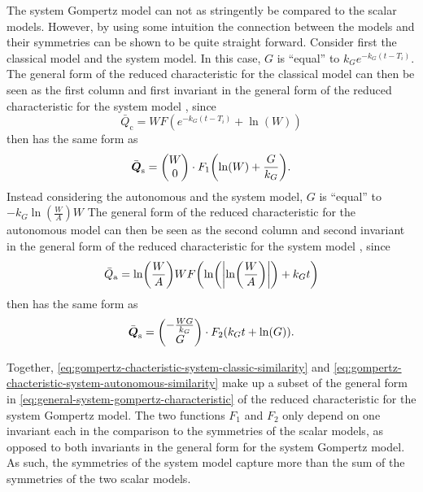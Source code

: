 The system Gompertz model can not as stringently be compared to the scalar models.
However, by using some intuition the connection between the models and their symmetries can be shown to be quite straight forward.
Consider first the classical model and the system model.
In this case, \(G\) is \enquote{equal} to \(k_G e^{-k_G (t - T_i)}\).
The general form of the reduced characteristic for the classical model  can then be seen as the first column and first invariant in the general form of the reduced characteristic for the system model , since
\begin{equation*}
  \bar{Q}_{\text{c}} = W F\left(e^{-k_G (t - T_i)} + \ln\left(W\right)\right)
\end{equation*}
then has the same form as
\begin{equation} \label{eq:gompertz-chacteristic-system-classic-similarity}
  \bar{\vect{Q}}_{\text{s}} =
  \begin{pmatrix}
    W \\
    0
  \end{pmatrix}
  \cdot F_1\left(\ln\left(W\right) + \frac{G}{k_G}\right).
\end{equation}
Instead considering the autonomous and the system model, \(G\) is \enquote{equal} to \(-k_G \ln\left(\frac{W}{A}\right) W\)
The general form of the reduced characteristic for the autonomous model  can then be seen as the second column and second invariant in the general form of the reduced characteristic for the system model , since
\begin{equation*}
  \bar{Q}_{\text{a}} = \ln\left(\frac{W}{A}\right) W F\left(\ln\left(\abs{\ln\left(\frac{W}{A}\right)}\right) + k_G t\right)
\end{equation*}
then has the same form as
\begin{equation} \label{eq:gompertz-chacteristic-system-autonomous-similarity}
  \bar{\vect{Q}}_{\text{s}} =
  \begin{pmatrix}
    - \frac{W G}{k_G} \\
    G
  \end{pmatrix}
  \cdot F_2\left(k_G t + \ln\left(G\right)\right).
\end{equation}

Together, \cref{eq:gompertz-chacteristic-system-classic-similarity} and \cref{eq:gompertz-chacteristic-system-autonomous-similarity} make up a subset of the general form in \cref{eq:general-system-gompertz-characteristic} of the reduced characteristic for the system Gompertz model.
The two functions \(F_1\) and \(F_2\) only depend on one invariant each in the comparison to the symmetries of the scalar models, as opposed to both invariants in the general form for the system Gompertz model.
As such, the symmetries of the system model capture more than the sum of the symmetries of the two scalar models.

